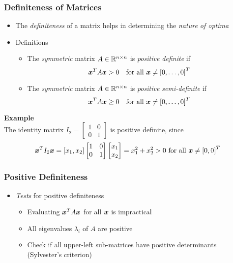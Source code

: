 \documentclass[%
  final,
  11pt, 
  show notes, %
  t, %
  fleqn, %
]{beamer}
\begin{document}
\begin{frame}[fragile]
  \frametitle{Definiteness of Matrices}
\begin{itemize}
\item The \emph{definiteness} of a matrix helps in determining the \emph{nature of optima}
\item Definitions
\begin{itemize}
\item The \emph{symmetric} matrix $A \in\mathbb{R}^{n \times n}$ is \emph{positive definite} if
\begin{equation*}
\bm{x}^T A \bm{x} > 0 \quad\text{for all } \bm{x} \neq \left[0, \ldots, 0\right]^T
\end{equation*}
\item The \emph{symmetric} matrix $A \in\mathbb{R}^{n \times n}$ is \emph{positive semi-definite} if
\begin{equation*}
\bm{x}^T A \bm{x} \geq 0 \quad\text{for all } \bm{x} \neq \left[0, \ldots, 0\right]^T
\end{equation*} 
\end{itemize}
\end{itemize}
\textbf{Example}\\
The identity matrix 
$I_2 = \begin{bmatrix}
1 & 0 \\
0 & 1 
\end{bmatrix}$
is positive definite, since
\begin{equation*}
\bm{x}^T I_2 \bm{x} = \left[ x_1, x_2 \right]
\begin{bmatrix}
1 & 0 \\
0 & 1
\end{bmatrix}
\begin{bmatrix}
x_1 \\
x_2
\end{bmatrix}
= x_1^2 + x_2^2 > 0 \text{ for all } \bm{x} \neq \left[ 0, 0 \right]^T
\end{equation*}
\end{frame}

\begin{frame}[fragile]
  \frametitle{Positive Definiteness}
\begin{itemize}
\item \emph{Tests} for positive definiteness
\begin{itemize}
\item Evaluating $\bm{x}^T A \bm{x}$ for all $\bm{x}$ is impractical
\item All eigenvalues $\lambda_i$ of $A$ are positive
\item Check if all upper-left sub-matrices have positive determinants (Sylvester's criterion)
\end{itemize}
\end{itemize}
\end{frame}
\end{document}

